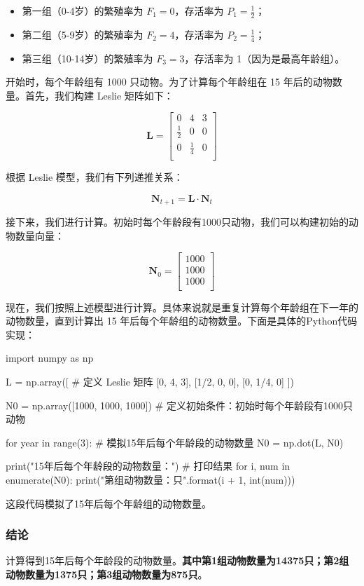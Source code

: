 \documentclass[a4,10pt,zihao=-4]{ctexart}
\begin{document}
\begin{itemize}
    \item 第一组（0-4岁）的繁殖率为 \(F_1 = 0\)，存活率为 \(P_1 = \frac{1}{2}\)；
    \item 第二组（5-9岁）的繁殖率为 \(F_2 = 4\)，存活率为 \(P_2 = \frac{1}{4}\)；
    \item 第三组（10-14岁）的繁殖率为 \(F_3 = 3\)，存活率为 1（因为是最高年龄组）。
\end{itemize}

开始时，每个年龄组有 1000 只动物。为了计算每个年龄组在 15 年后的动物数量。首先，我们构建 Leslie 矩阵如下：

\[
\mathbf{L} = \begin{bmatrix}
0 & 4 & 3 \\
\frac{1}{2} & 0 & 0  \\
0 & \frac{1}{4} & 0 \\
\end{bmatrix}
\]

根据 Leslie 模型，我们有下列递推关系：

\[
\mathbf{N}_{t+1} = \mathbf{L} \cdot \mathbf{N}_t
\]


接下来，我们进行计算。初始时每个年龄段有1000只动物，我们可以构建初始的动物数量向量：

\[
\mathbf{N}_0 = \begin{bmatrix}
1000 \\
1000 \\
1000 \\
\end{bmatrix}
\]

现在，我们按照上述模型进行计算。具体来说就是重复计算每个年龄组在下一年的动物数量，直到计算出 15 年后每个年龄组的动物数量。下面是具体的Python代码实现：

\begin{python}
import numpy as np

L = np.array([ # 定义 Leslie 矩阵
    [0, 4, 3],
    [1/2, 0, 0],
    [0, 1/4, 0]
])

N0 = np.array([1000, 1000, 1000]) # 定义初始条件：初始时每个年龄段有1000只动物

for year in range(3): # 模拟15年后每个年龄段的动物数量
    N0 = np.dot(L, N0)

print("15年后每个年龄段的动物数量：") # 打印结果
for i, num in enumerate(N0):
    print("第{}组动物数量：{}只".format(i + 1, int(num)))

\end{python}

这段代码模拟了15年后每个年龄组的动物数量。

\subsubsection{结论}
计算得到15年后每个年龄段的动物数量。\textbf{其中第1组动物数量为14375只；第2组动物数量为1375只；第3组动物数量为875只}。




\end{document}
